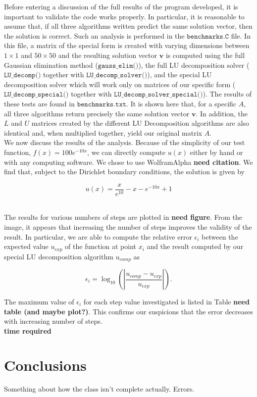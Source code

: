 \documentclass[12pt]{article}
\numberwithin{equation}{section}
\begin{document}
Before entering a discussion of the full results of the program developed, it is important to validate the code works properly.  In particular, it is reasonable to assume that, if all three algorithms written predict the same solution vector, then the solution is correct.  Such an analysis is performed in the $\texttt{benchmarks.C}$ file.  In this file, a matrix of the special form is created with varying dimensions between $1\times1$ and $50\times50$ and the resulting solution vector $\textbf{v}$ is computed using the full Gaussian elimination method ($\texttt{gauss\_elim()}$), the full LU decomposition solver ($\texttt{LU\_decomp()}$ together with $\texttt{LU\_decomp\_solver()}$), and the special LU decomposition solver which will work only on matrices of our specific form ($\texttt{LU\_decomp\_special()}$ together with $\texttt{LU\_decomp\_solver\_special()}$).  The results of these tests are found in $\texttt{benchmarks.txt}$.  It is shown here that, for a specific $A$, all three algorithms return precisely the same solution vector $\textbf{v}$.  In addition, the $L$ and $U$ matrices created by the different LU Decomposition algorithms are also identical and, when multiplied together, yield our original matrix $A$.
\\\indent We now discuss the results of the analysis.  Because of the simplicity of our test function, $f\left(x\right)=100e^{-10x}$, we can directly compute $u\left(x\right)$ either by hand or with any computing software.  We chose to use WolframAlpha \textbf{need citation}.  We find that, subject to the Dirichlet boundary conditions, the solution is given by 

\begin{equation}
\label{eq:expectsol}
u\left(x\right)=\frac{x}{e^{10}}-x-e^{-10x}+1
\end{equation}

\\\indent The results for various numbers of steps are plotted in \textbf{need figure}.  From the image, it appears that increasing the number of steps improves the validity of the result.  In particular, we are able to compute the relative error $\epsilon_{i}$ between the expected value $u_{exp}$ of the function at point $x_{i}$ and the result computed by our special LU decomposition algorithm $u_{comp}$ as 

\begin{equation}
\label{eq:relerror}
\epsilon_{i} = \log_{10}\left(|\frac{u_{comp}-u_{exp}}{u_{exp}}|\right).
\end{equation}

\noindent The maximum value of $\epsilon_{i}$ for each step value investigated is listed in Table \textbf{need table (and maybe plot?)}.  This confirms our suspicions that the error decreases with increasing number of steps.
\\\textbf{time required}

\section{Conclusions}
\label{sec:conclusions}

Something about how the class isn't complete actually.  Errors.
\end{document}
